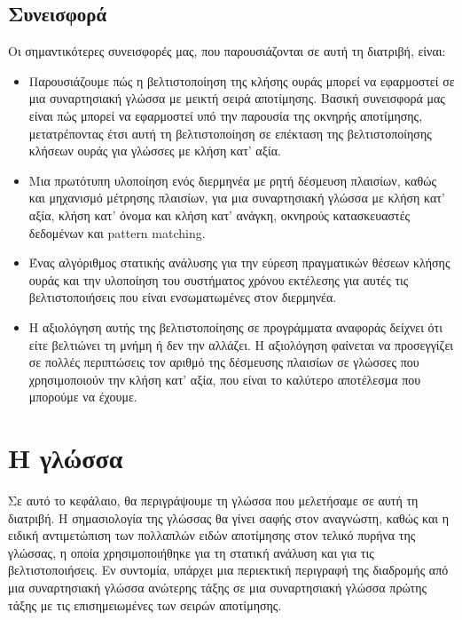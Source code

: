 \documentclass[diploma]{softlab-thesis}
\begin{document}
\section{Συνεισφορά}

Οι σημαντικότερες συνεισφορές μας, που παρουσιάζονται σε αυτή τη διατριβή, είναι:

\begin{itemize}
\item Παρουσιάζουμε πώς η βελτιστοποίηση της κλήσης ουράς μπορεί να εφαρμοστεί σε μια συναρτησιακή 
γλώσσα με μεικτή σειρά αποτίμησης. Βασική συνεισφορά μας είναι πώς μπορεί να εφαρμοστεί
υπό την παρουσία της οκνηρής αποτίμησης, μετατρέποντας έτσι αυτή τη βελτιστοποίηση σε επέκταση της 
βελτιστοποίησης κλήσεων ουράς για γλώσσες με κλήση κατ' αξία.

\item Μια πρωτότυπη υλοποίηση ενός διερμηνέα με ρητή δέσμευση πλαισίων, καθώς και μηχανισμό μέτρησης 
πλαισίων, για μια συναρτησιακή γλώσσα με κλήση κατ' αξία, κλήση κατ' όνομα και κλήση κατ' ανάγκη, οκνηρούς 
κατασκευαστές δεδομένων και pattern matching.

\item Ένας αλγόριθμος στατικής ανάλυσης για την εύρεση πραγματικών θέσεων κλήσης ουράς 
και την υλοποίηση του συστήματος χρόνου εκτέλεσης για αυτές τις βελτιστοποιήσεις που είναι 
ενσωματωμένες στον διερμηνέα.

\item Η αξιολόγηση αυτής της βελτιστοποίησης σε προγράμματα αναφοράς δείχνει ότι είτε βελτιώνει 
τη μνήμη ή δεν την αλλάζει. Η αξιολόγηση φαίνεται να προσεγγίζει σε πολλές περιπτώσεις τον αριθμό της
δέσμευσης πλαισίων σε γλώσσες που χρησιμοποιούν την κλήση κατ' αξία, που είναι το καλύτερο αποτέλεσμα 
που μπορούμε να έχουμε.
\end{itemize}
%

\chapter{Η γλώσσα}

Σε αυτό το κεφάλαιο, θα περιγράψουμε τη γλώσσα που μελετήσαμε σε αυτή τη διατριβή.
Η σημασιολογία της γλώσσας θα γίνει σαφής στον αναγνώστη, καθώς και
η ειδική αντιμετώπιση των πολλαπλών ειδών αποτίμησης στον τελικό πυρήνα της
γλώσσας, η οποία χρησιμοποιήθηκε για τη στατική ανάλυση και για τις βελτιστοποιήσεις. Εν συντομία, 
υπάρχει μια
περιεκτική περιγραφή της διαδρομής από μια συναρτησιακή γλώσσα ανώτερης τάξης
σε μια συναρτησιακή γλώσσα πρώτης τάξης με τις επισημειωμένες των σειρών αποτίμησης.
\end{document}
